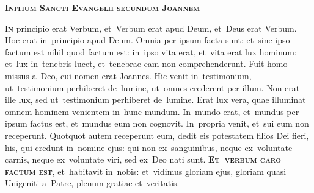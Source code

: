 \documentclass[first]{../altarcard}
\begin{document}
\begin{center}

    \begin{minipage}{0.7\linewidth}

        \vspace*{3cm}

        \begin{center}
            \scshape\bfseries\Huge
            Initium Sancti Evangelii secundum Joannem
        \end{center}


        \huge

        \lettrine[lines=3]{\color{newred}I}{\bfseries\color{newred}n} principio
        erat Verbum, et~Verbum erat apud Deum, et~Deus erat Verbum. Hoc erat
        in~principio apud Deum. Omnia per ipsum facta sunt: et~sine ipso factum
        est nihil quod factum est: in~ipso vita erat, et~vita erat lux hominum:
        et~lux in~tenebris lucet, et~tenebrae eam non comprehenderunt. Fuit homo
        missus a~Deo, cui nomen erat Joannes. Hic venit in~testimonium,
        ut~testimonium perhiberet de~lumine, ut~omnes crederent per illum. Non
        erat ille lux, sed ut~testimonium perhiberet de~lumine. Erat lux vera,
        quae illuminat omnem hominem venientem in~hunc mundum. In~mundo erat,
        et~mundus per ipsum factus est, et~mundus eum non cognovit. In~propria
        venit, et~sui eum non receperunt. Quotquot autem receperunt eum, dedit
        eis potestatem filios Dei fieri, his, qui credunt in~nomine ejus: qui
        non ex~sanguinibus, neque ex~voluntate carnis, neque ex~voluntate viri,
        sed ex~Deo nati sunt.
        \textcolor{newred}{\textbf{\textsc{Et~verbum caro factum est}}},
        et~habitavit in~nobis: et~vidimus gloriam ejus, gloriam quasi Unigeniti
        a~Patre, plenum gratiae et~veritatis.
    \end{minipage}
\end{center}

\vspace*{1cm}
\end{document}
